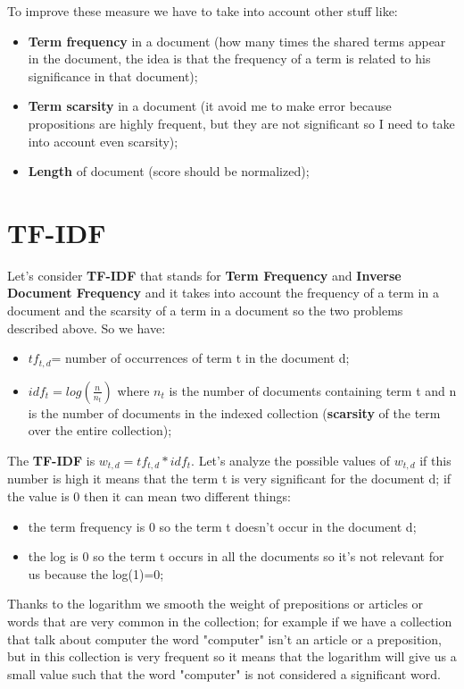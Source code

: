 To improve these measure we have to take into account other stuff like:
\begin{itemize}
    \item \textbf{Term frequency} in a document (how many times the shared terms appear in the document, the idea is that the frequency of a term is related to his significance in that document);
    \item \textbf{Term scarsity} in a document (it avoid me to make error because propositions are highly frequent, but they are not significant so I need to take into account even scarsity);
    \item \textbf{Length} of document (score should be normalized);
\end{itemize}
\section{TF-IDF}
Let's consider \textbf{TF-IDF} that stands for \textbf{Term Frequency} and \textbf{Inverse Document Frequency} and it takes into account the frequency of a term in a document and the scarsity of a term in a document so the two problems described above.\newline
So we have:
\begin{itemize}
    \item $tf_{t,d}$= number of occurrences of term t in the document d;
    \item $idf_t=log(\frac{n}{n_t})$ where $n_t$ is the number of documents containing term t and n is the number of documents in the indexed collection (\textbf{scarsity} of the term over the entire collection);
\end{itemize}
The \textbf{TF-IDF} is $w_{t,d}=tf_{t,d}*idf_t$.\newline
Let's analyze the possible values of $w_{t,d}$ if this number is high it means that the term t is very significant for the document d; if the value is 0 then it can mean two different things:
\begin{itemize}
    \item the term frequency is 0 so the term t doesn't occur in the document d;
    \item the log is 0 so the term t occurs in all the documents so it's not relevant for us because the log(1)=0;
\end{itemize}
Thanks to the logarithm we smooth the weight of prepositions or articles or words that are very common in the collection; for example if we have a collection that talk about computer the word "computer" isn't an article or a preposition, but in this collection is very frequent so it means that the logarithm will give us a small value such that the word "computer" is not considered a significant word.\newline
